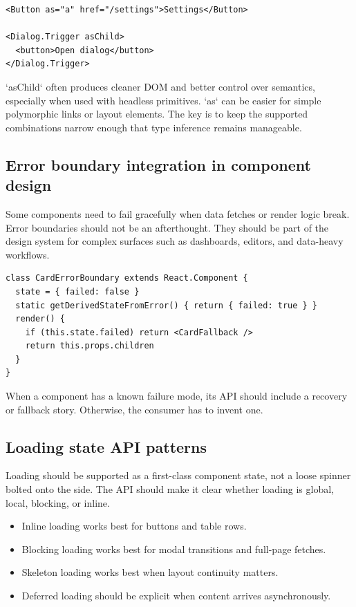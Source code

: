 \begin{verbatim}
<Button as="a" href="/settings">Settings</Button>

<Dialog.Trigger asChild>
  <button>Open dialog</button>
</Dialog.Trigger>
\end{verbatim}

`asChild` often produces cleaner DOM and better control over semantics, especially when used with headless primitives. `as` can be easier for simple polymorphic links or layout elements. The key is to keep the supported combinations narrow enough that type inference remains manageable.

\subsection{Error boundary integration in component design}
Some components need to fail gracefully when data fetches or render logic break. Error boundaries should not be an afterthought. They should be part of the design system for complex surfaces such as dashboards, editors, and data-heavy workflows.

\begin{verbatim}
class CardErrorBoundary extends React.Component {
  state = { failed: false }
  static getDerivedStateFromError() { return { failed: true } }
  render() {
    if (this.state.failed) return <CardFallback />
    return this.props.children
  }
}
\end{verbatim}

When a component has a known failure mode, its API should include a recovery or fallback story. Otherwise, the consumer has to invent one.

\subsection{Loading state API patterns}
Loading should be supported as a first-class component state, not a loose spinner bolted onto the side. The API should make it clear whether loading is global, local, blocking, or inline.

\begin{itemize}[leftmargin=*, itemsep=0.35em]
  \item Inline loading works best for buttons and table rows.
  \item Blocking loading works best for modal transitions and full-page fetches.
  \item Skeleton loading works best when layout continuity matters.
  \item Deferred loading should be explicit when content arrives asynchronously.
\end{itemize}

